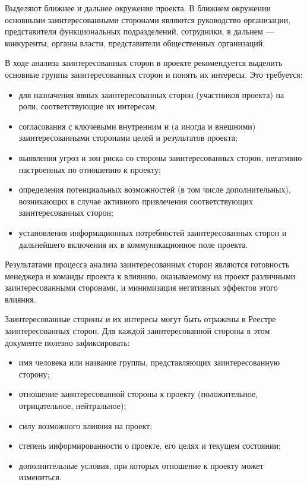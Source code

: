 Выделяют ближнее и дальнее окружение проекта.
В ближнем окружении основными заинтересованными сторонами являются руко­водство организации, представители функциональных подразделений,
сотрудники, в дальнем --- конкуренты, органы власти, представители общественных организаций.

В ходе анализа заинтересованных сторон в проекте рекомендуется выделить основные группы заинтересованных сторон и понять их ин­тересы.
Это требуется:
\begin{itemize}
	\item для назначения явных заинтересованных сторон (участников про­екта) на роли, соответствующие их интересам;
	\item согласования с ключевыми внутренним и (а иногда и внешними) заинтересованными сторонами целей и результатов проекта;
	\item выявления угроз и зон риска со стороны заинтересованных сторон, негативно настроенных по отношению к проекту;
	\item определения потенциальных возможностей (в том числе дополни­тельных), возникающих в случае активного привлечения соответ­ствующих заинтересованных сторон;
	\item установления информационных потребностей заинтересованных сторон и дальнейшего включения их в коммуникационное поле проекта.
\end{itemize}

Результатами процесса анализа заинтересованных сторон являются готовность менеджера и команды проекта к влиянию, оказываемому на проект различными заинтересованными сторонами, и минимизация негативных эффектов этого влияния.

Заинтересованные стороны и их интересы могут быть отражены в Реестре заинтересованных сторон.
Для каждой заинтересованной стороны в этом документе полезно зафиксировать:
\begin{itemize}
	\item имя человека или название группы, представляющих заинтересо­ванную сторону;
	\item отношение заинтересованной стороны к проекту (положительное, отрицательное, нейтральное);
	\item силу возможного влияния на проект;
	\item степень информированности о проекте, его целях и текущем со­стоянии;
	\item дополнительные условия, при которых отношение к проекту может измениться.
\end{itemize}

